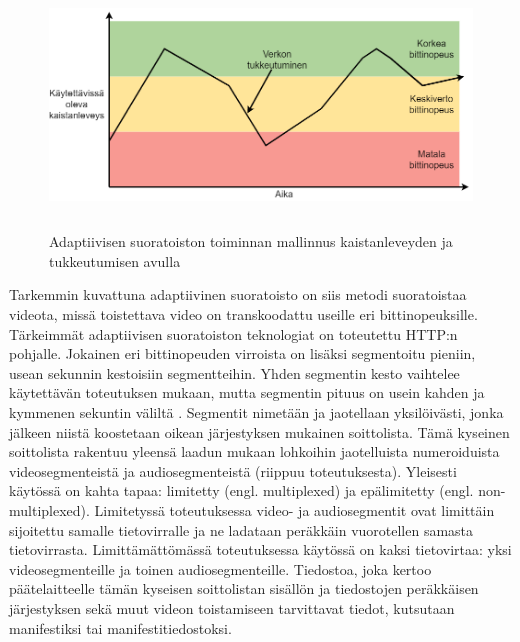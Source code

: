 \documentclass[finnish, 12pt, a4paper, elec, utf8, a-1b, online]{aaltothesis}
\begin{document}
\begin{figure}[htb]
  \centering
  \includegraphics[height=6.5cm]{./img/abr-bandwidth.png}
  \caption{Adaptiivisen suoratoiston toiminnan mallinnus kaistanleveyden ja tukkeutumisen avulla \label{kuva4}}
\end{figure}

\noindent Tarkemmin kuvattuna adaptiivinen suoratoisto on siis metodi suoratoistaa videota, missä toistettava video on transkoodattu useille eri bittinopeuksille. Tärkeimmät adaptiivisen suoratoiston teknologiat on toteutettu HTTP:n pohjalle. Jokainen eri bittinopeuden virroista on lisäksi segmentoitu pieniin, usean sekunnin kestoisiin segmentteihin. Yhden segmentin kesto vaihtelee käytettävän toteutuksen mukaan, mutta segmentin pituus on usein kahden ja kymmenen sekuntin väliltä \cite{Segment}. Segmentit nimetään ja jaotellaan yksilöivästi, jonka jälkeen niistä koostetaan oikean järjestyksen mukainen soittolista. Tämä kyseinen soittolista rakentuu yleensä laadun mukaan lohkoihin jaotelluista numeroiduista videosegmenteistä ja audiosegmenteistä (riippuu toteutuksesta). Yleisesti käytössä on kahta tapaa: limitetty (engl. multiplexed) ja epälimitetty (engl. non-multiplexed). Limitetyssä toteutuksessa video- ja audiosegmentit ovat limittäin sijoitettu samalle tietovirralle ja ne ladataan peräkkäin vuorotellen samasta tietovirrasta. Limittämättömässä toteutuksessa käytössä on kaksi tietovirtaa: yksi videosegmenteille ja toinen audiosegmenteille. Tiedostoa, joka kertoo päätelaitteelle tämän kyseisen soittolistan sisällön ja tiedostojen peräkkäisen järjestyksen sekä muut videon toistamiseen tarvittavat tiedot, kutsutaan manifestiksi tai manifestitiedostoksi. \cite{Ottverse} \\
\end{document}

